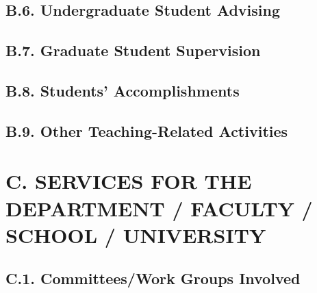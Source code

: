 \documentclass[10pt]{article}
\begin{document}


\subsection*{B.6. Undergraduate Student Advising}




\subsection*{B.7. Graduate Student Supervision}





\subsection*{B.8. Students’ Accomplishments}



\subsection*{B.9. Other Teaching-Related Activities}



\section*{C. SERVICES FOR THE DEPARTMENT / FACULTY / SCHOOL / UNIVERSITY}

\subsection*{C.1. Committees/Work Groups Involved}
\end{document}
